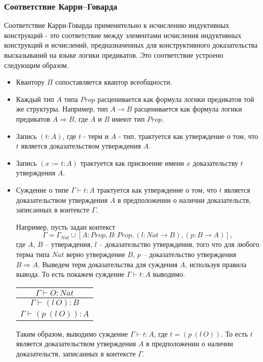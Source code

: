 \documentclass[12pt]{article}
\begin{document}
\subsubsection{Соответствие Карри--Говарда}
Соответствие Карри-Говарда \cite{CHC} применительно к исчислению индуктивных конструкций \cite{CHCCOQ} - это соответствие между элементами исчисления индуктивных конструкций и исчислений, предназначенных для конструктивного доказательства высказываний на языке логики предикатов.
Это соответствие устроено следующим образом.
\begin{itemize}
    \item Квантору $\Pi$ сопоставляется квантор всеобщности.
    \item Каждый тип $A$ типа $Prop$ расценивается как формула логики предикатов той же структуры. Например, тип $A \xrightarrow{} B$ расценивается как формула логики предикатов $A \Rightarrow B$, где $A$ и $B$ имеют тип $Prop$.
    
    \item Запись $(t : A)$, где $t$ - терм и $A$ - тип, трактуется как утверждение о том, что $t$ является доказательством утверждения $A$.
    \item Запись $(x := t : A)$ трактуется как присвоение имени $x$ доказательству $t$ утверждения $A$.
    \item Суждение о типе $\Gamma \vdash t : A$ трактуется как утверждение о том, что $t$ является доказательством утверждения $A$ в предположении о наличии доказательств, записанных в контексте $\Gamma$.
    
Например, пусть задан контекст
$$\Gamma = \Gamma_{Nat} \cup [A:Prop, B:Prop, (l: Nat \xrightarrow{} B), (p:B \xrightarrow{} A)],$$ 
где $A$, $B$ -- утверждения, $l$ -- доказательство утверждения, того что для любого терма типа $Nat$ верно утверждение $B$, $p$ -- доказательство утверждения $B \Rightarrow A$. Выведем терм доказательства для суждения $A$, используя правила вывода.
То есть покажем суждение $\Gamma \vdash t: A$ выводимо.

\begin{center}
    \begin{tabular}{c}
         $\Gamma \vdash O: Nat$\\
         \hline
         $\Gamma \vdash (l\ O): B$\\
         \hline
         $\Gamma \vdash (p\ (l\ O)): A$
    \end{tabular}
\end{center}
Таким образом, выводимо суждение $\Gamma \vdash t: A$, где $t=(p\ (l\ O))$. То есть $t$ является доказательством утверждения $A$ в предположении о наличии доказательств, записанных в контексте $\Gamma$. 
\end{itemize}
\end{document}
